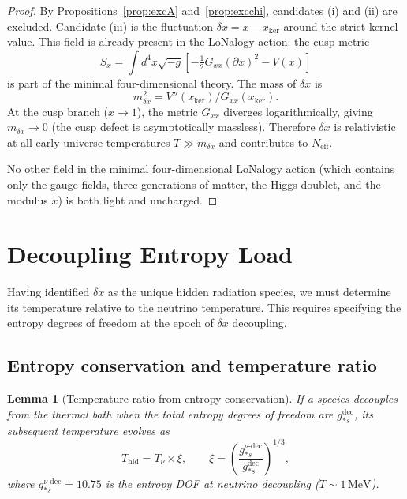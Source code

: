 \documentclass[12pt]{article}
\theoremstyle{plain}
\newtheorem{lemma}[theorem]{Lemma}
\theoremstyle{definition}
\numberwithin{equation}{section}
\newcommand{\kker}{\mathrm{ker}}
\newcommand{\eff}{\mathrm{eff}}
\newcommand{\hid}{\mathrm{hid}}
\newcommand{\dec}{\mathrm{dec}}
\begin{document}
\begin{proof}
By Propositions~\ref{prop:excA} and~\ref{prop:excchi}, candidates (i) and (ii)
are excluded.  Candidate (iii) is the fluctuation $\delta x=x-x_{\kker}$
around the strict kernel value.  This field is already present in the
LoNalogy action: the cusp metric~\cite{ParticleCosmo}
\begin{equation}
S_x = \int d^4x\sqrt{-g}\left[-\tfrac{1}{2}G_{xx}(\partial x)^2 - V(x)\right]
\end{equation}
is part of the minimal four-dimensional theory.  The mass of $\delta x$ is
\begin{equation}
m_{\delta x}^2 = V''(x_{\kker})/G_{xx}(x_{\kker}).
\end{equation}
At the cusp branch ($x\to1$), the metric $G_{xx}$ diverges logarithmically,
giving $m_{\delta x}\to 0$ (the cusp defect is asymptotically massless).
Therefore $\delta x$ is relativistic at all early-universe temperatures
$T\gg m_{\delta x}$ and contributes to $N_{\eff}$.

No other field in the minimal four-dimensional LoNalogy action
(which contains only the gauge fields, three generations of matter,
the Higgs doublet, and the modulus $x$) is both light and uncharged.
\end{proof}


\section{Decoupling Entropy Load}\label{sec:entropy}

Having identified $\delta x$ as the unique hidden radiation species, we
must determine its temperature relative to the neutrino temperature.
This requires specifying the entropy degrees of freedom at the epoch
of $\delta x$ decoupling.

\subsection{Entropy conservation and temperature ratio}

\begin{lemma}[Temperature ratio from entropy conservation]\label{lem:xi}
If a species decouples from the thermal bath when the total entropy
degrees of freedom are $g_{*s}^{\dec}$, its subsequent temperature
evolves as
\begin{equation}
T_{\hid} = T_\nu\times\xi,
\qquad
\xi = \left(\frac{g_{*s}^{\nu\text{-}\dec}}{g_{*s}^{\dec}}\right)^{1/3},
\end{equation}
where $g_{*s}^{\nu\text{-}\dec}=10.75$ is the entropy DOF at
neutrino decoupling ($T\sim1\,\mathrm{MeV}$).
\end{lemma}
\end{document}
